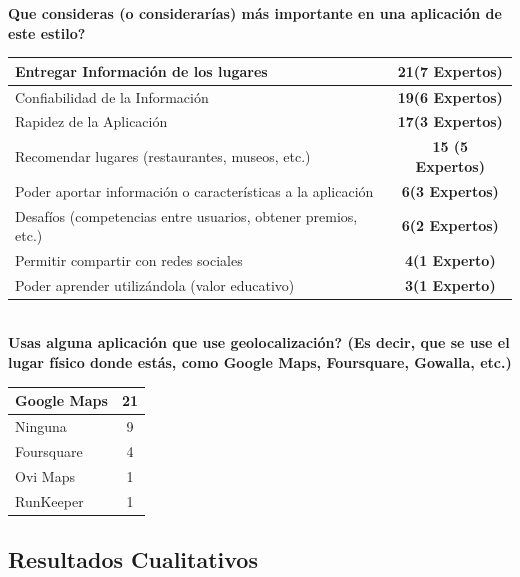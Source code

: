 \documentclass[10pt,letterpaper]{article}
\begin{document}
\textbf{Que consideras (o considerarías) más importante en una aplicación de este estilo?}\\

\begin{tabular}{| l | c |}
\hline
    Entregar Información de los lugares & \textbf{21(7 Expertos)} \\ \hline
    Confiabilidad de la Información & \textbf{19(6 Expertos)} \\ \hline
    Rapidez de la Aplicación & \textbf{17(3 Expertos)} \\ \hline
    Recomendar lugares (restaurantes, museos, etc.) & \textbf{15 (5 Expertos)}\\ \hline
    Poder aportar información o características a la aplicación & \textbf{6(3 Expertos)}\\ \hline
    Desafíos (competencias entre usuarios, obtener premios, etc.) & \textbf{6(2 Expertos)}\\ \hline
    Permitir compartir con redes sociales & \textbf{4(1 Experto)}\\ \hline
    Poder aprender utilizándola (valor educativo) & \textbf{3(1 Experto)} \\
    \hline 
\end{tabular}\\

\textbf{Usas alguna aplicación que use geolocalización? (Es decir, que se use el lugar físico donde estás, como Google Maps, Foursquare, Gowalla, etc.)} \\

\begin{tabular}{| l | c |}
\hline
Google Maps & 21 \\ \hline
Ninguna & 9 \\ \hline
Foursquare & 4 \\ \hline
Ovi Maps & 1 \\ \hline
RunKeeper & 1 \\ \hline
\end{tabular}


\subsection{Resultados Cualitativos}
\end{document}
